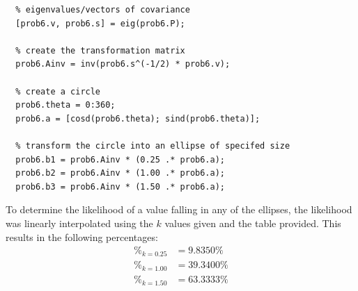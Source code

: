 \documentclass[11pt]{article}
\begin{document}
\begin{enumerate}[label=\textbf{\arabic*.}]
\begin{lstlisting}
  % eigenvalues/vectors of covariance
  [prob6.v, prob6.s] = eig(prob6.P);

  % create the transformation matrix
  prob6.Ainv = inv(prob6.s^(-1/2) * prob6.v);

  % create a circle
  prob6.theta = 0:360;
  prob6.a = [cosd(prob6.theta); sind(prob6.theta)];

  % transform the circle into an ellipse of specifed size
  prob6.b1 = prob6.Ainv * (0.25 .* prob6.a);
  prob6.b2 = prob6.Ainv * (1.00 .* prob6.a);
  prob6.b3 = prob6.Ainv * (1.50 .* prob6.a);
  \end{lstlisting}
  To determine the likelihood of a value falling in any of the ellipses, the 
  likelihood was linearly interpolated using the $k$ values given and the table 
  provided. This results in the following percentages:
  \begin{equation*}
    \begin{split}
      \%_{k=0.25} &= 9.8350 \% \\
      \%_{k=1.00} &= 39.3400 \% \\
      \%_{k=1.50} &= 63.3333 \% \\
    \end{split}
  \end{equation*}


\end{enumerate}
\end{document}
